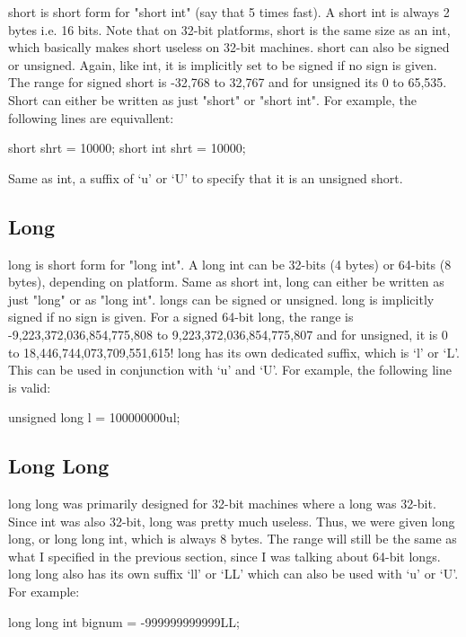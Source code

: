 \documentclass{article}
\begin{document}
short is short form for "short int" (say that 5 times fast). A short int is always 2 bytes i.e. 16 bits. Note
that on 32-bit platforms, short is the same size as an int, which basically makes short useless on 32-bit
machines. short can also be signed or unsigned. Again, like int, it is implicitly set to be signed if no sign
is given. The range for signed short is -32,768 to 32,767 and for unsigned its 0 to 65,535. Short can either
be written as just "short" or "short int". For example, the following lines are equivallent:

\begin{cblk}
short shrt = 10000;
short int shrt = 10000;
\end{cblk}

Same as int, a suffix of ‘u’ or ‘U’ to specify that it is an unsigned short.

\subsection{Long}

long is short form for "long int". A long int can be 32-bits (4 bytes) or 64-bits (8 bytes), depending on
platform. Same as short int, long can either be written as just "long" or as "long int". longs can be signed
or unsigned. long is implicitly signed if no sign is given. For a signed 64-bit long, the range is
-9,223,372,036,854,775,808 to 9,223,372,036,854,775,807 and for unsigned, it is 0 to 18,446,744,073,709,551,615!
long has its own dedicated suffix, which is ‘l’ or ‘L’. This can be used in conjunction with ‘u’ and ‘U’. For
example, the following line is valid:

\begin{cblk}
unsigned long l = 100000000ul;
\end{cblk}

\subsection{Long Long}

long long was primarily designed for 32-bit machines where a long was 32-bit. Since int was also 32-bit, long
was pretty much useless. Thus, we were given long long, or long long int, which is always 8 bytes. The range
will still be the same as what I specified in the previous section, since I was talking about 64-bit longs.
long long also has its own suffix ‘ll’ or ‘LL’ which can also be used with ‘u’ or ‘U’. For example:

\begin{cblk}
long long int bignum = -999999999999LL;
\end{cblk}
\end{document}
